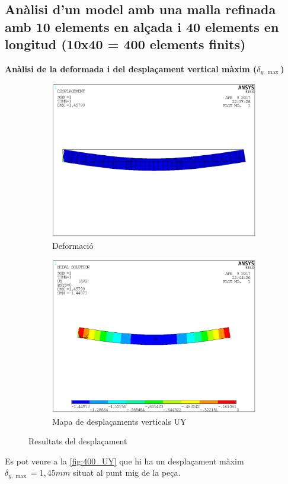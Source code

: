 \documentclass[a4paper]{article}
\def\imgS{0.42\textwidth}
\begin{document}
\subsection{Anàlisi d'un model amb una malla refinada amb 10 elements en alçada i 40 elements en longitud (10x40 = 400 elements finits)}
\textbf{Anàlisi de la deformada i del desplaçament vertical màxim ($\delta_{y, \max}$)}
\begin{figure}[H]
	\begin{subfigure}{\imgS}
		\includegraphics[width=\textwidth]{images/400_deformed}
		\caption{Deformació}
		\label{fig:400_deformed}
	\end{subfigure}
	\hfill
	\begin{subfigure}{\imgS}
		\includegraphics[width=\textwidth]{images/400_UY}
		\caption{Mapa de desplaçaments verticals UY}
		\label{fig:400_UY}
	\end{subfigure}
	\caption{Resultats del desplaçament}
	\label{fig:400_displacement}
\end{figure}
Es pot veure a la \autoref{fig:400_UY} que hi ha un desplaçament màxim $\delta_{y,\max} = 1,45mm$ situat al punt mig de la peça. 
\end{document}
